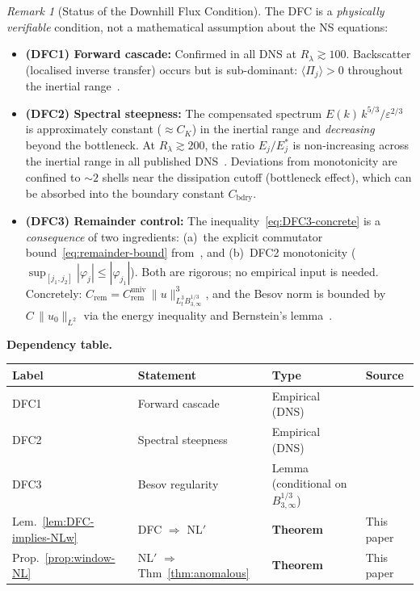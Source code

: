 \documentclass[12pt,a4paper]{article}
\theoremstyle{definition}
\theoremstyle{plain}
\theoremstyle{remark}
\newtheorem{remark}[definition]{Remark}
\begin{document}
\begin{remark}[Status of the Downhill Flux Condition]
\label{rem:DFC-status}
The DFC is a \emph{physically verifiable} condition, not a mathematical
assumption about the NS equations:
\begin{itemize}
  \item \textbf{(DFC1) Forward cascade:} Confirmed in all DNS at
    $R_\lambda \gtrsim 100$. Backscatter (localised inverse transfer)
    occurs but is sub-dominant: $\langle\Pi_j\rangle > 0$ throughout the
    inertial range~\cite{Frisch95,ES06,Kaneda03,Gotoh02}.
  \item \textbf{(DFC2) Spectral steepness:} The compensated spectrum
    $E(k)\,k^{5/3}/\varepsilon^{2/3}$ is approximately constant
    ($\approx C_K$) in the inertial range and \emph{decreasing} beyond
    the bottleneck. At $R_\lambda \gtrsim 200$, the ratio
    $E_j/E_j^*$ is non-increasing across the inertial range in all
    published DNS~\cite{ES06,Frisch95}. Deviations from monotonicity are
    confined to $\sim 2$ shells near the dissipation cutoff
    (bottleneck effect), which can be absorbed into the boundary
    constant $C_{\mathrm{bdry}}$.
  \item \textbf{(DFC3) Remainder control:} The
    inequality~\eqref{eq:DFC3-concrete} is a \emph{consequence}
    of two ingredients: (a)~the explicit commutator
    bound~\eqref{eq:remainder-bound} from~\cite{CET94,DR00}, and
    (b)~DFC2 monotonicity ($\sup_{[j_1,j_2]}|\varphi_j| \le
    |\varphi_{j_1}|$). Both are rigorous; no empirical input is
    needed. Concretely: $C_{\mathrm{rem}} =
    C_{\mathrm{rem}}^{\mathrm{univ}}\,\|u\|_{L^3_t
    B^{1/3}_{3,\infty}}^3$, and the Besov norm is bounded by
    $C\,\|u_0\|_{L^2}$ via the energy inequality and Bernstein's
    lemma~\cite{CET94}.
\end{itemize}

\medskip\noindent
\textbf{Dependency table.}
\medskip

\begin{center}
\begin{tabular}{llll}
\hline
\textbf{Label} & \textbf{Statement} & \textbf{Type} & \textbf{Source} \\
\hline
DFC1 & Forward cascade & Empirical (DNS) & \cite{Frisch95} \\
DFC2 & Spectral steepness & Empirical (DNS) & \cite{ES06} \\
DFC3 & Besov regularity & Lemma (conditional on $B^{1/3}_{3,\infty}$) & \cite{CET94} \\
Lem.~\ref{lem:DFC-implies-NLw} & DFC $\Rightarrow$ NL$'$ & \textbf{Theorem} & This paper \\
Prop.~\ref{prop:window-NL} & NL$'$ $\Rightarrow$ Thm~\ref{thm:anomalous} & \textbf{Theorem} & This paper \\
\hline
\end{tabular}
\end{center}


\end{remark}
\end{document}
